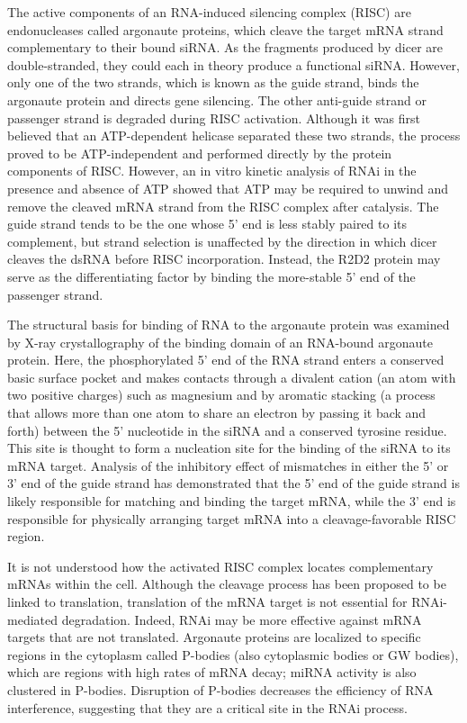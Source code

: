The active components of an RNA-induced silencing complex (RISC) are endonucleases called argonaute proteins, which cleave the target mRNA strand complementary to their bound siRNA. As the fragments produced by dicer are double-stranded, they could each in theory produce a functional siRNA. However, only one of the two strands, which is known as the guide strand, binds the argonaute protein and directs gene silencing. The other anti-guide strand or passenger strand is degraded during RISC activation. Although it was first believed that an ATP-dependent helicase separated these two strands, the process proved to be ATP-independent and performed directly by the protein components of RISC. However, an in vitro kinetic analysis of RNAi in the presence and absence of ATP showed that ATP may be required to unwind and remove the cleaved mRNA strand from the RISC complex after catalysis. The guide strand tends to be the one whose 5' end is less stably paired to its complement, but strand selection is unaffected by the direction in which dicer cleaves the dsRNA before RISC incorporation. Instead, the R2D2 protein may serve as the differentiating factor by binding the more-stable 5' end of the passenger strand.

The structural basis for binding of RNA to the argonaute protein was examined by X-ray crystallography of the binding domain of an RNA-bound argonaute protein. Here, the phosphorylated 5' end of the RNA strand enters a conserved basic surface pocket and makes contacts through a divalent cation (an atom with two positive charges) such as magnesium and by aromatic stacking (a process that allows more than one atom to share an electron by passing it back and forth) between the 5' nucleotide in the siRNA and a conserved tyrosine residue. This site is thought to form a nucleation site for the binding of the siRNA to its mRNA target. Analysis of the inhibitory effect of mismatches in either the 5' or 3' end of the guide strand has demonstrated that the 5' end of the guide strand is likely responsible for matching and binding the target mRNA, while the 3' end is responsible for physically arranging target mRNA into a cleavage-favorable RISC region.

It is not understood how the activated RISC complex locates complementary mRNAs within the cell. Although the cleavage process has been proposed to be linked to translation, translation of the mRNA target is not essential for RNAi-mediated degradation. Indeed, RNAi may be more effective against mRNA targets that are not translated. Argonaute proteins are localized to specific regions in the cytoplasm called P-bodies (also cytoplasmic bodies or GW bodies), which are regions with high rates of mRNA decay; miRNA activity is also clustered in P-bodies. Disruption of P-bodies decreases the efficiency of RNA interference, suggesting that they are a critical site in the RNAi process.

